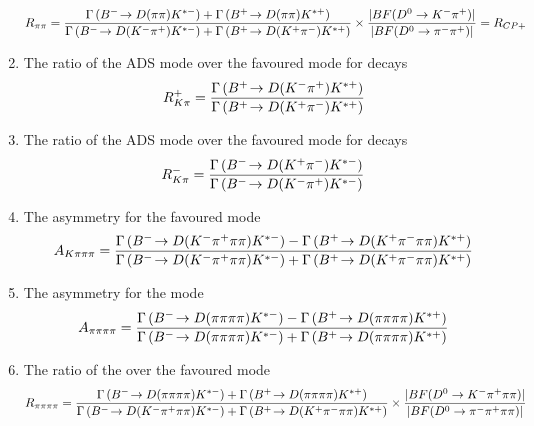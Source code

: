 \begin{enumerate}
{\begin{equation}
R_{\pi\pi} = \frac{\Gamma\left({{{B}^-}}\!\rightarrow {\ensuremath{D}}(\pi\pi){{K}^{*-}}\right) + \Gamma\left({{{B}^+}}\!\rightarrow {\ensuremath{D}}(\pi\pi){{K}^{*+}}\right)}{\Gamma\left({{{B}^-}}\!\rightarrow {\ensuremath{D}}({{K}^-}{{\pi}^+}){{K}^{*-}}\right) + \Gamma\left({{{B}^+}}\!\rightarrow {\ensuremath{D}}({{K}^+}{{\pi}^-}){{K}^{*+}}\right)} \times \frac{|BF(D^0 \rightarrow K^-\pi^+)|}{|BF(D^0 \rightarrow \pi^-\pi^+)|} = R_{CP+}
\label{eqn:Rpipi}
\end{equation}
}
\item{The ratio of the ADS mode over the favoured mode for \Bp decays
\begin{equation}
R^+_{K\pi} = \frac{\Gamma\left({{{B}^+}}\!\rightarrow {\ensuremath{D}}({{K}^-}{{\pi}^+}){{K}^{*+}}\right)}{\Gamma\left({{{B}^+}}\!\rightarrow {\ensuremath{D}}({{K}^+}{{\pi}^-}){{K}^{*+}}\right)}
\label{eqn:Rplus}
\end{equation}
}
\item{The ratio of the ADS mode over the favoured mode for \Bm decays
\begin{equation}
R^-_{K\pi} = \frac{\Gamma\left({{{B}^-}}\!\rightarrow {\ensuremath{D}}({{K}^+}{{\pi}^-}){{K}^{*-}}\right)}{\Gamma\left({{{B}^-}}\!\rightarrow {\ensuremath{D}}({{K}^-}{{\pi}^+}){{K}^{*-}}\right)}
\label{eqn:Rminus}
\end{equation}
}
\item{The \CP asymmetry for the favoured \decay{\Dz}{\Km\pip\pim\pip} mode
\begin{equation}
A_{{K}\pi\pi\pi} = \frac{\Gamma\left({{{B}^-}}\!\rightarrow {\ensuremath{D}}({{K}^-}{{\pi}^+}\pi\pi){{K}^{*-}}\right) - \Gamma\left({{{B}^+}}\!\rightarrow {\ensuremath{D}}({{K}^+}{{\pi}^-}\pi\pi){{K}^{*+}}\right)}{\Gamma\left({{{B}^-}}\!\rightarrow {\ensuremath{D}}({{K}^-}{{\pi}^+}\pi\pi){{K}^{*-}}\right) + \Gamma\left({{{B}^+}}\!\rightarrow {\ensuremath{D}}({{K}^+}{{\pi}^-}\pi\pi){{K}^{*+}}\right)}
\label{eqn:Akpipipi}
\end{equation}
}
\item{The \CP asymmetry for the \decay{\D}{\pip\pim\pip\pim} mode
\begin{equation}
A_{\pi\pi\pi\pi} = \frac{\Gamma\left({{{B}^-}}\!\rightarrow {\ensuremath{D}}(\pi\pi\pi\pi){{K}^{*-}}\right) - \Gamma\left({{{B}^+}}\!\rightarrow {\ensuremath{D}}(\pi\pi\pi\pi){{K}^{*+}}\right)}{\Gamma\left({{{B}^-}}\!\rightarrow {\ensuremath{D}}(\pi\pi\pi\pi){{K}^{*-}}\right) + \Gamma\left({{{B}^+}}\!\rightarrow {\ensuremath{D}}(\pi\pi\pi\pi){{K}^{*+}}\right)}
\label{eqn:Apipipipi}
\end{equation}
}
\item{The ratio of the \decay{\D}{\pip\pim\pip\pim} over the favoured mode
{\footnotesize
\begin{equation}
R_{\pi\pi\pi\pi} = \frac{\Gamma\left(\decay{\Bm}{\D(\pi\pi\pi\pi)\Kstarm}\right) + \Gamma\left(\decay{\Bp}{\D(\pi\pi\pi\pi)\Kstarp}\right)}{\Gamma\left(\decay{\Bm}{\D(\Km\pip\pi\pi)\Kstarm}\right) + \Gamma\left(\decay{\Bp}{\D(\Kp\pim\pi\pi)\Kstarp}\right)} \times \frac{|BF(D^0 \to \Km\pip\pi\pi)|}{|BF(D^0 \to \pim\pip\pi\pi)|}

\end{equation}}}
\end{enumerate}
